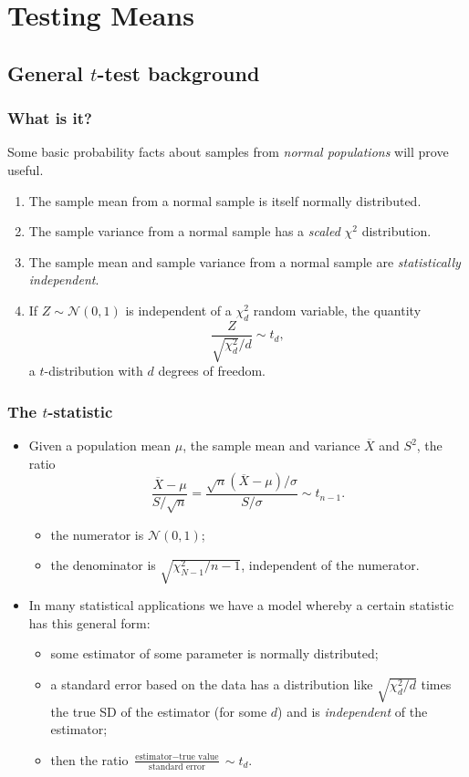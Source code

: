 \documentclass[a4paper]{article}
\begin{document}
\section{Testing Means}\label{sec:10}
\subsection{General \( t \)-test background}
\subsubsection{What is it?}
Some basic probability facts about samples from \textit{normal populations} will prove useful.
\begin{enumerate}
	\item The sample mean from a normal sample is itself normally distributed.
	\item The sample variance from a normal sample has a \textit{scaled} \( \chi^2 \) distribution.
	\item The sample mean and sample variance from a normal sample are \textit{statistically independent}.
	\item If \( Z \sim \mathcal{N}(0,1) \) is independent of a \( \chi^2_d \) random variable, the quantity
	\[
		\frac{Z}{\sqrt{\chi^2_d}/d} \sim t_d,
	\]
	a \( t \)-distribution with \( d \) degrees of freedom.
\end{enumerate}
\subsubsection{The \( t \)-statistic}
\begin{itemize}
	\item Given a population mean \( \mu \), the sample mean and variance \( \overline{X} \) and \( S^2 \), the ratio
	\[
		\frac{\overline{X}-\mu}{S / \sqrt{n}} = \frac{\sqrt{n}(\overline{X} - \mu)/\sigma}{S / \sigma} \sim t_{n-1}.
	\]
	\begin{itemize}
		\item the numerator is \( \mathcal{N}(0,1) \);
		\item the denominator is \( \sqrt{\chi^2_{N-1}/n-1} \), independent of the numerator.
	\end{itemize}
	\item In many statistical applications we have a model whereby a certain statistic has this general form:
	\begin{itemize}
		\item some estimator of some parameter is normally distributed;
		\item a standard error based on the data has a distribution like \( \sqrt{\chi^2_d/d} \) times the true SD of the estimator (for some \( d \)) and is \textit{independent} of the estimator;
		\item then the ratio \( \frac{\text{estimator}-\text{true value}}{\text{standard error}} \sim t_d \).
	\end{itemize}
\end{itemize}
\end{document}
